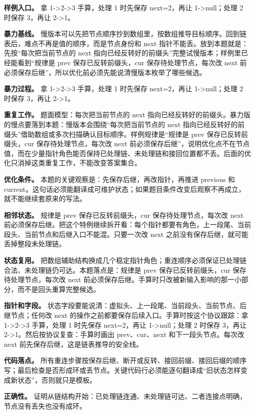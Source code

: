 \textbf{样例入口。} 拿 1->2->3 手算，处理 1 时先保存 next=2，再让 1->null；处理 2 时保存 3，再让 2->1。

\textbf{暴力基线。} 慢版本可以先把节点顺序抄到数组里，按数组推导目标顺序。回到链表后，难点不再是值的顺序，而是节点身份和 next 指针不能丢。放到本题就是：先按“每次把当前节点的 next 指向已经反转好的前缀头”完整试慢版本；样例里已经能看到“规律是 prev 保存已反转前缀头，cur 保存待处理节点，每次改 next 前必须保存后继”，所以优化前必须先能说清慢版本枚举了哪些候选。

\textbf{暴力过程。} 拿 1->2->3 手算，处理 1 时先保存 next=2，再让 1->null；处理 2 时保存 3，再让 2->1。

\textbf{重复工作。} 题面模型：每次把当前节点的 next 指向已经反转好的前缀头。暴力版的慢点要落到本题：慢版本会围绕“每次把当前节点的 next 指向已经反转好的前缀头”借助数组或多次扫描确认目标顺序。样例规律是“规律是 prev 保存已反转前缀头，cur 保存待处理节点，每次改 next 前必须保存后继”，说明优化点不在节点值，而在少量指针角色能否保持已处理链、未处理链和接回位置都不丢。后面的优化只消掉这类重复工作，不能改变答案集合。

\textbf{优化条件。} 本题的关键观察是：先保存后继，再改指针，再推进 previous 和 current。这句话必须能翻译成可维护状态；如果题目条件改变后观察不再成立，就不能继续套原来的写法。

\textbf{相邻状态。} 规律是 prev 保存已反转前缀头，cur 保存待处理节点，每次改 next 前必须保存后继。把这个特例继续拆开看：每个指针都要有角色，上一段尾、当前段头、当前节点和后继入口不能混。只要一次改 next 之前没有保存后继，就可能丢掉整段未处理链。

\textbf{状态复用。} 把数组辅助结构换成几个稳定指针角色；重连顺序必须保证已处理链合法、未处理链仍可达。本题落点是：规律是 prev 保存已反转前缀头，cur 保存待处理节点，每次改 next 前必须保存后继。手算时只改被新输入影响的那一小部分，而不是回头重算完整候选。

\textbf{指针和字段。} 状态字段要能说清：虚拟头、上一段尾、当前段头、当前节点、后继节点；任何改 next 的操作之前都要保存后续入口。手算时按这个协议跟踪：拿 1->2->3 手算，处理 1 时先保存 next=2，再让 1->null；处理 2 时保存 3，再让 2->1。然后按协议复查：手算时画出 prev、cur、next 和下一段头节点。每次改 next 前先保存后继，这是链表推导的安全线。

\textbf{代码落点。} 所有重连步骤按保存后继、断开或反转、接回前缀、接回后缀的顺序写；最后检查是否形成环或丢节点。关键代码行必须能逐句翻译成“旧状态怎样变成新状态”，否则就只是模板。

\textbf{正确性。} 证明从链结构开始：已处理链连通、未处理链可达、二者连接点明确，节点没有丢失也没有成环。

